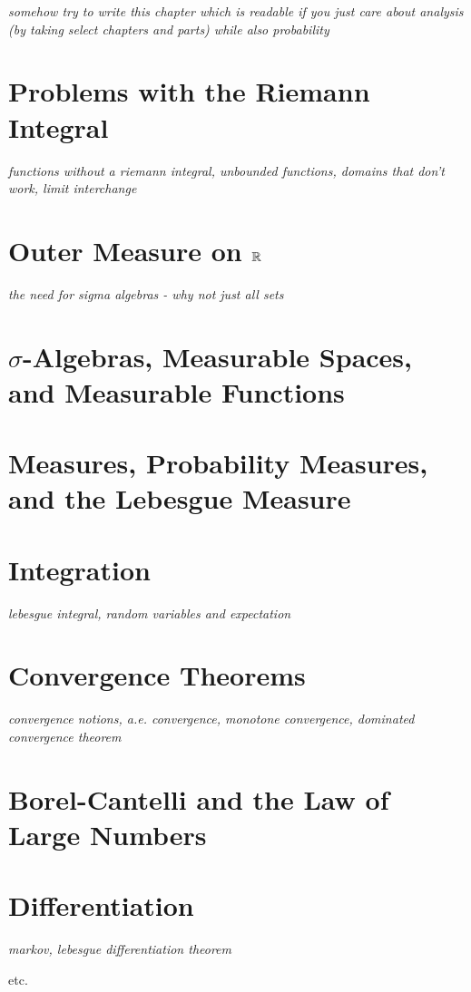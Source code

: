 \documentclass[../../../main.tex]{subfiles}
\begin{document}

\textit{somehow try to write this chapter which is readable if you just care about analysis (by taking select chapters and parts) while also probability}

\section{Problems with the Riemann Integral}
\textit{functions without a riemann integral, unbounded functions, domains that don't work, limit interchange}
\section{Outer Measure on $\mathbb{R}$}
\textit{the need for sigma algebras - why not just all sets}
\section{$\sigma$-Algebras, Measurable Spaces, and Measurable Functions}
\section{Measures, Probability Measures, and the Lebesgue Measure}
\section{Integration}
\textit{lebesgue integral, random variables and expectation}
\section{Convergence Theorems}
\textit{convergence notions, a.e. convergence, monotone convergence, dominated convergence theorem}
\section{Borel-Cantelli and the Law of Large Numbers}
\section{Differentiation}
\textit{markov, lebesgue differentiation theorem}

etc.


\printbibliography[
    heading=subbibintoc,
    title={References}
]
\end{document}
